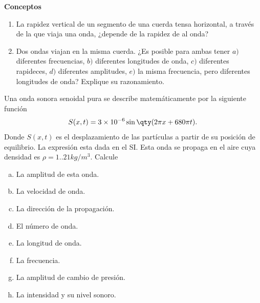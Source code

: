 \begin{mdframed}[style=warning]
	\textbf{Conceptos}
		\begin{enumerate}
			\item La rapidez vertical de un segmento de una cuerda tensa horizontal, a través de la que viaja una onda, ¿depende de la rapidez de al onda?
			\item Dos ondas viajan en la misma cuerda. ¿Es posible para ambas tener $a)$ diferentes frecuencias, $b)$ diferentes longitudes de onda, $c)$ diferentes rapideces, $d)$ diferentes amplitudes, $e)$ la misma frecuencia, pero diferentes longitudes de onda? Explique su razonamiento.
		\end{enumerate}
\end{mdframed}



















\begin{mdframed}[style=warning]
	\begin{ejercicio}
		Una onda sonora senoidal pura se describe matemáticamente por la siguiente función
			$$ S(x,t) = 3\times 10^{-6} \sin{\qty(2\pi x + 680\pi t)}. $$
		Donde $S(x,t)$ es el desplazamiento de las partículas a partir de su posición de equilibrio. La expresión esta dada en el SI. Esta onda se propaga en el aire cuya densidad es $\rho = 1..21kg/m^3$. Calcule
		\begin{multicols}{2}
			\begin{enumerate}[a)]
				\item La amplitud de esta onda.
				\item La velocidad de onda.
				\item La dirección de la propagación.
				\item El número de onda.
				\item La longitud de onda.
				\item La frecuencia.
				\item La amplitud de cambio de presión.
				\item La intensidad y su nivel sonoro.
			\end{enumerate}
		\end{multicols}
	\end{ejercicio}
\end{mdframed}


























